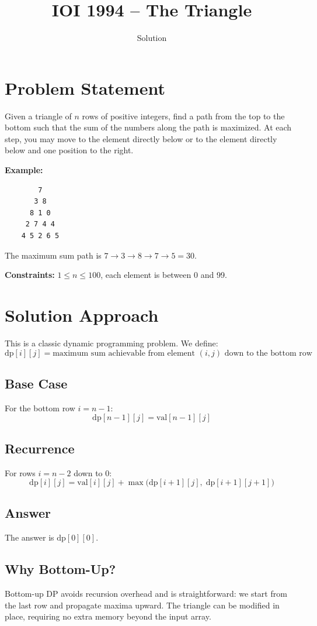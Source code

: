 \documentclass[11pt,a4paper]{article}
\title{IOI 1994 -- The Triangle}
\author{Solution}
\date{}
\begin{document}
\maketitle

\section{Problem Statement}

Given a triangle of $n$ rows of positive integers, find a path from the top to the bottom
such that the sum of the numbers along the path is maximized.
At each step, you may move to the element directly below or to the element
directly below and one position to the right.

\medskip
\noindent\textbf{Example:}
\begin{verbatim}
        7
       3 8
      8 1 0
     2 7 4 4
    4 5 2 6 5
\end{verbatim}
The maximum sum path is $7 \to 3 \to 8 \to 7 \to 5 = 30$.

\medskip
\noindent\textbf{Constraints:} $1 \le n \le 100$, each element is between 0 and 99.

\section{Solution Approach}

This is a classic dynamic programming problem. We define:
\[
  \text{dp}[i][j] = \text{maximum sum achievable from element } (i,j) \text{ down to the bottom row}
\]

\subsection{Base Case}
For the bottom row $i = n-1$:
\[
  \text{dp}[n-1][j] = \text{val}[n-1][j]
\]

\subsection{Recurrence}
For rows $i = n-2$ down to $0$:
\[
  \text{dp}[i][j] = \text{val}[i][j] + \max\!\big(\text{dp}[i+1][j],\;\text{dp}[i+1][j+1]\big)
\]

\subsection{Answer}
The answer is $\text{dp}[0][0]$.

\subsection{Why Bottom-Up?}
Bottom-up DP avoids recursion overhead and is straightforward: we start from the last
row and propagate maxima upward. The triangle can be modified in place, requiring no
extra memory beyond the input array.
\end{document}
